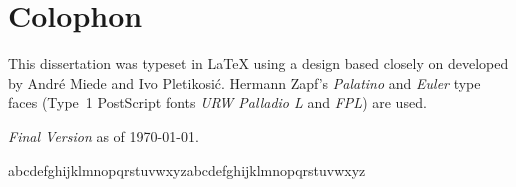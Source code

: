 \pagestyle{empty}

\hfill

\vfill


\section*{Colophon}
This dissertation was typeset in \LaTeX{}  using a design based closely on \texttt{\classicthesis} developed by Andr\'e Miede and Ivo Pletikosić.
Hermann Zapf's \emph{Palatino} and \emph{Euler} type faces (Type~1 PostScript fonts \emph{URW Palladio L} and \emph{FPL}) are used.

\bigskip

\noindent
\textit{Final Version} as of \today.




% 
% 
\noindent
abcdefghijklmnopqrstuvwxyzabcdefghijklmnopqrstuvwxyz
   


